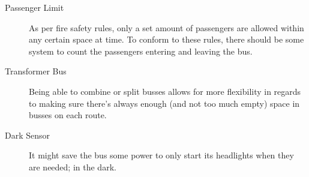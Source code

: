 \begin{description}
\item[Passenger Limit]
As per fire safety rules, only a set amount of passengers are allowed within any certain space at time. To conform to these rules, there should be some system to count the passengers entering and leaving the bus.

\item[Transformer Bus]
Being able to combine or split busses allows for more flexibility in regards to making sure there's always enough (and not too much empty) space in busses on each route. 

\item[Dark Sensor]
It might save the bus some power to only start its headlights when they are needed; in the dark.

\end{description}













